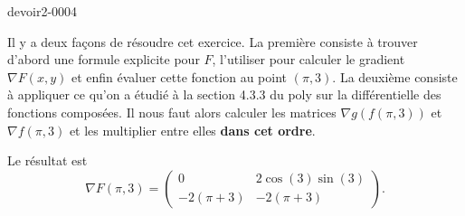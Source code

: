 \begin{corrige}{devoir2-0004}

Il y a deux façons de résoudre cet exercice. La première consiste à trouver d'abord une formule explicite pour $F$, l'utiliser pour calculer le gradient $\nabla F(x,y)$ et enfin évaluer cette fonction au point $(\pi, 3)$. La deuxième consiste à appliquer ce qu'on a étudié à la section 4.3.3 du poly sur la différentielle des fonctions composées. Il nous faut alors calculer les matrices  $\nabla g(f(\pi,3))$ et $\nabla f(\pi, 3)$ et les multiplier entre elles \textbf{dans cet ordre}.

Le résultat est 
\begin{equation}
 \nabla F(\pi, 3) =
 \begin{pmatrix}
   0 & 2\cos(3)\sin(3)\\
   -2(\pi+3) & -2(\pi+3)
 \end{pmatrix}.
\end{equation}
  
\end{corrige}
